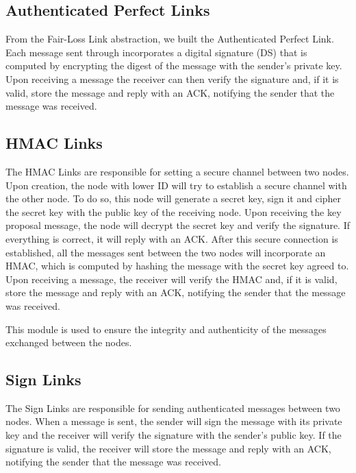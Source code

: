 \documentclass{article}
\begin{document}


\subsection{Authenticated Perfect Links}
From the Fair-Loss Link abstraction, we built the Authenticated Perfect Link. Each message 
sent through incorporates a digital signature (DS) that is computed by encrypting the 
digest of the message with the sender's private key. Upon receiving a message the receiver 
can then verify the signature and, if it is valid, store the message and reply with an 
ACK, notifying the sender that the message was received.

\subsection{HMAC Links}
The HMAC Links are responsible for setting a secure channel between two nodes. Upon creation, 
the node with lower ID will try to establish a secure channel with the other node. To do so, 
this node will generate a secret key, sign it and cipher the secret key with the public key of 
the receiving node. Upon receiving the key proposal message, the node will decrypt the secret 
key and verify the signature. If everything is correct, it will reply with an ACK. After this 
secure connection is established, all the messages sent between the two nodes will incorporate 
an HMAC, which is computed by hashing the message with the secret key agreed to. Upon receiving 
a message, the receiver will verify the HMAC and, if it is valid, store the message and reply 
with an ACK, notifying the sender that the message was received.

This module is used to ensure the integrity and authenticity of the messages exchanged between 
the nodes.

\subsection{Sign Links}
The Sign Links are responsible for sending authenticated messages between two nodes. When a 
message is sent, the sender will sign the message with its private key and the receiver will 
verify the signature with the sender's public key. If the signature is valid, the receiver will 
store the message and reply with an ACK, notifying the sender that the message was received.
\end{document}
